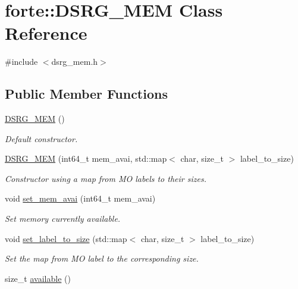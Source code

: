 \hypertarget{classforte_1_1_d_s_r_g___m_e_m}{}\section{forte\+:\+:D\+S\+R\+G\+\_\+\+M\+EM Class Reference}
\label{classforte_1_1_d_s_r_g___m_e_m}


{\ttfamily \#include $<$dsrg\+\_\+mem.\+h$>$}

\subsection*{Public Member Functions}
\begin{DoxyCompactItemize}
\item 
\mbox{\hyperlink{classforte_1_1_d_s_r_g___m_e_m_a7889ef1265286f9e83d4f2e57f2d0184}{D\+S\+R\+G\+\_\+\+M\+EM}} ()
\begin{DoxyCompactList}\small\item\em Default constructor. \end{DoxyCompactList}\item 
\mbox{\hyperlink{classforte_1_1_d_s_r_g___m_e_m_aca48bd076cfd1e92573821a857b76e54}{D\+S\+R\+G\+\_\+\+M\+EM}} (int64\+\_\+t mem\+\_\+avai, std\+::map$<$ char, size\+\_\+t $>$ label\+\_\+to\+\_\+size)
\begin{DoxyCompactList}\small\item\em Constructor using a map from MO labels to their sizes. \end{DoxyCompactList}\item 
void \mbox{\hyperlink{classforte_1_1_d_s_r_g___m_e_m_a6385e6f596c51a495f537672f6c86b4e}{set\+\_\+mem\+\_\+avai}} (int64\+\_\+t mem\+\_\+avai)
\begin{DoxyCompactList}\small\item\em Set memory currently available. \end{DoxyCompactList}\item 
void \mbox{\hyperlink{classforte_1_1_d_s_r_g___m_e_m_a6f9be312b939223601bbc870700a5b49}{set\+\_\+label\+\_\+to\+\_\+size}} (std\+::map$<$ char, size\+\_\+t $>$ label\+\_\+to\+\_\+size)
\begin{DoxyCompactList}\small\item\em Set the map from MO label to the corresponding size. \end{DoxyCompactList}\item 
size\+\_\+t \mbox{\hyperlink{classforte_1_1_d_s_r_g___m_e_m_a2339785c4d656ff51becb628c9c60926}{available}} ()

\end{DoxyCompactItemize}
